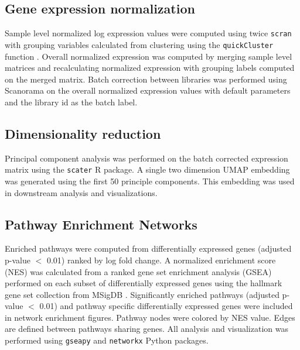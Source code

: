 \subsection{Gene expression normalization}

Sample level normalized log expression values were computed using twice \texttt{scran} \cite{lun2016pooling} with grouping variables calculated from clustering using the \texttt{quickCluster} function \cite{lun2016step}. Overall normalized expression was computed by merging sample level matrices and recalculating normalized expression with grouping labels computed on the merged matrix. Batch correction between libraries was performed using Scanorama \cite{hie2019efficient} on the overall normalized expression values with default parameters and the library id as the batch label. 

\subsection{Dimensionality reduction}

Principal component analysis was performed on the batch corrected expression matrix using the \texttt{scater} \cite{mccarthy2017scater} R package. A single two dimension UMAP \cite{becht2019dimensionality} embedding was generated using the first 50 principle components. This embedding was used in downstream analysis and visualizations.

\subsection{Pathway Enrichment Networks}

Enriched pathways were computed from differentially expressed genes (adjusted p-value $<$ 0.01) ranked by log fold change.  A normalized enrichment score (NES) was calculated from a ranked gene set enrichment analysis (GSEA) \cite{shi2007gene} performed on each subset of differentially expressed genes using the hallmark gene set collection from MSigDB \cite{liberzon2015molecular}.  Significantly enriched pathways (adjusted p-value $<$ 0.01) and pathway specific differentially expressed genes were included in network enrichment figures.  
Pathway nodes were colored by NES value. Edges are defined between pathways sharing genes.
All analysis and visualization was performed using \texttt{gseapy} and \texttt{networkx} \cite{hagberg2008exploring} Python packages.

